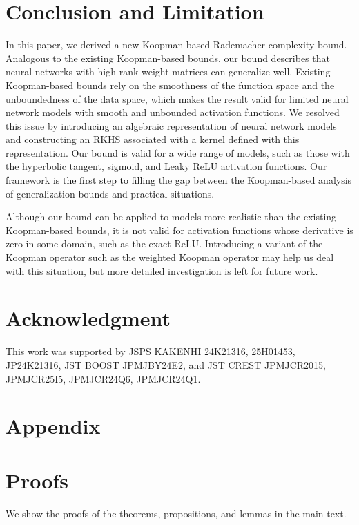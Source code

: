 \documentclass[twoside]{article}
\def\red#1{\textcolor{black}{#1}}
\begin{document}
\section{Conclusion and Limitation}
In this paper, we derived a new Koopman-based Rademacher complexity bound.
Analogous to the existing Koopman-based bounds, our bound describes that neural networks with high-rank weight matrices can generalize well.
Existing Koopman-based bounds rely on the smoothness of the function space and the unboundedness of the data space, which makes the result valid for limited neural network models with smooth and unbounded activation functions.
We resolved this issue by introducing an algebraic representation of neural network models and constructing an RKHS associated with a kernel defined with this representation.
Our bound is valid for a wide range of models, such as those with the hyperbolic tangent, sigmoid, and Leaky ReLU activation functions.
Our framework \red{is the first step to} filling the gap between the Koopman-based analysis of generalization bounds and practical situations.

Although our bound can be applied to models more realistic than the existing Koopman-based bounds, it is not valid for activation functions whose derivative is zero in some domain, such as the exact ReLU.
Introducing a variant of the Koopman operator such as the weighted Koopman operator may help us deal with this situation, but more detailed investigation is left for future work.

\section*{Acknowledgment}
This work was supported by JSPS KAKENHI 24K21316, 25H01453, JP24K21316, JST BOOST JPMJBY24E2, and JST CREST JPMJCR2015, JPMJCR25I5, JPMJCR24Q6, JPMJCR24Q1.




\appendix
\section*{Appendix}

\section{Proofs}\label{ap:proofs}
We show the proofs of the theorems, propositions, and lemmas in the main text.
\end{document}
